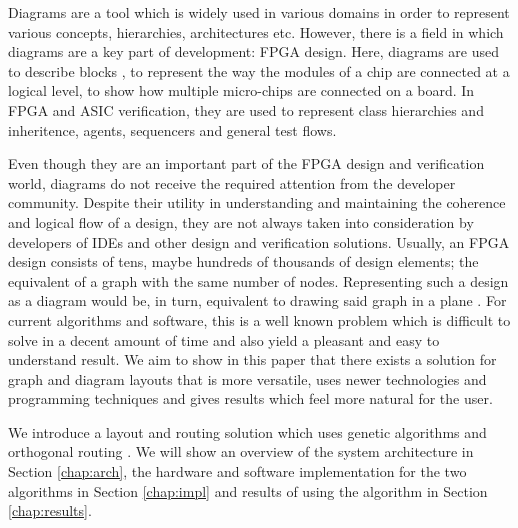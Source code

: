 Diagrams are a tool which is widely used in various domains in order to represent
various concepts, hierarchies, architectures etc. However, there is a field in 
which diagrams are a key part of development: FPGA design. Here, diagrams are used
to describe blocks \cite{jeon2007verification}, to represent the way the modules of a chip are connected at a 
logical level, to show how multiple micro-chips are connected on a board. In FPGA 
and ASIC verification, they are used to represent class hierarchies and inheritence, 
agents, sequencers and general test flows.

Even though they are an important part of the FPGA design and verification world, 
diagrams do not receive the required attention from the developer community. Despite 
their utility in understanding and maintaining the coherence and logical flow of a
design, they are not always taken into consideration by developers of IDEs and other 
design and verification solutions. Usually, an FPGA design consists of tens, maybe hundreds 
of thousands of design elements; the equivalent of a graph with the same number of nodes. 
Representing such a design as a diagram would be, in turn, equivalent to drawing said graph 
in a plane \cite{de1990draw}. For current algorithms and software, this is a well known problem which is 
difficult to solve in a decent amount of time and also yield a pleasant and easy to 
understand result. We aim to show in this paper that there exists a solution for graph 
and diagram layouts that is more versatile, uses newer technologies and programming 
techniques and gives results which feel more natural for the user.

We introduce a layout and routing solution which uses genetic algorithms and orthogonal
routing \cite{wybrow2010orthogonal}. We will show an overview of the system architecture in Section \ref{chap:arch}, 
the hardware and software implementation for the two algorithms in Section \ref{chap:impl} 
and results of using the algorithm in Section \ref{chap:results}. 
